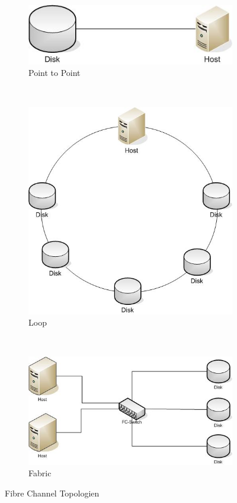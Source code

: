 \begin{figure}
	\centering
	\begin{subfigure}[b]{0.3\textwidth}
		\includegraphics[width=\textwidth]{fig/fc-point-to-point}
		\caption{Point to Point}
	\end{subfigure}
	~
	\begin{subfigure}[b]{0.3\textwidth}
		\includegraphics[width=\textwidth]{fig/fc-loop}
		\caption{Loop}
	\end{subfigure}
	~
	\begin{subfigure}[b]{0.3\textwidth}
		\includegraphics[width=\textwidth]{fig/fc-fabric}
		\caption{Fabric}
	\end{subfigure}
	\caption{Fibre Channel Topologien}\label{fig:fc-topologien}
\end{figure}

